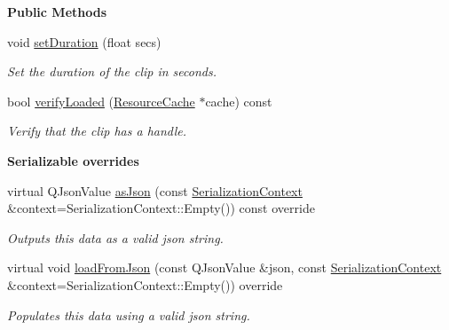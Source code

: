 \begin{Indent}\textbf{ Public Methods}\par
\begin{DoxyCompactItemize}
\item 
\mbox{\label{classrev_1_1_animation_clip_ae664fd55eff8b60d85eeddefec162ce9}} 
void \mbox{\hyperlink{classrev_1_1_animation_clip_ae664fd55eff8b60d85eeddefec162ce9}{set\+Duration}} (float secs)
\begin{DoxyCompactList}\small\item\em Set the duration of the clip in seconds. \end{DoxyCompactList}\item 
\mbox{\label{classrev_1_1_animation_clip_ab41d2a71346daf043d6850ae2d0db96b}} 
bool \mbox{\hyperlink{classrev_1_1_animation_clip_ab41d2a71346daf043d6850ae2d0db96b}{verify\+Loaded}} (\mbox{\hyperlink{classrev_1_1_resource_cache}{Resource\+Cache}} $\ast$cache) const
\begin{DoxyCompactList}\small\item\em Verify that the clip has a handle. \end{DoxyCompactList}\end{DoxyCompactItemize}
\end{Indent}
\begin{Indent}\textbf{ Serializable overrides}\par
\begin{DoxyCompactItemize}
\item 
\mbox{\label{classrev_1_1_animation_clip_ae0d0907535216f216d20bfa8dd4a5993}} 
virtual Q\+Json\+Value \mbox{\hyperlink{classrev_1_1_animation_clip_ae0d0907535216f216d20bfa8dd4a5993}{as\+Json}} (const \mbox{\hyperlink{structrev_1_1_serialization_context}{Serialization\+Context}} \&context=Serialization\+Context\+::\+Empty()) const override
\begin{DoxyCompactList}\small\item\em Outputs this data as a valid json string. \end{DoxyCompactList}\item 
\mbox{\label{classrev_1_1_animation_clip_afb7cbd8e225bd27ce81f8ae1686b17d8}} 
virtual void \mbox{\hyperlink{classrev_1_1_animation_clip_afb7cbd8e225bd27ce81f8ae1686b17d8}{load\+From\+Json}} (const Q\+Json\+Value \&json, const \mbox{\hyperlink{structrev_1_1_serialization_context}{Serialization\+Context}} \&context=Serialization\+Context\+::\+Empty()) override
\begin{DoxyCompactList}\small\item\em Populates this data using a valid json string. \end{DoxyCompactList}\end{DoxyCompactItemize}
\end{Indent}
